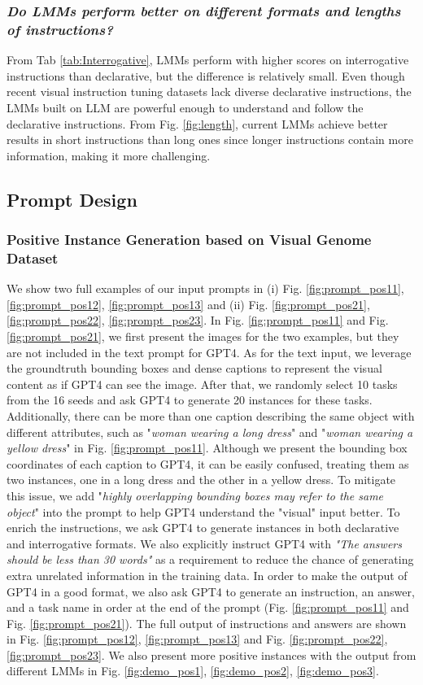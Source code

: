 \subsubsection{\textit{Do LMMs perform better on different formats and lengths of instructions? }}

From Tab \ref{tab:Interrogative}, LMMs perform with higher scores on interrogative instructions than declarative, but the difference is relatively small. Even though recent visual instruction tuning datasets lack diverse declarative instructions, the LMMs built on LLM are powerful enough to understand and follow the declarative instructions. From Fig. \ref{fig:length}, current LMMs achieve better results in short instructions than long ones since longer instructions contain more information, making it more challenging. 

\subsection{Prompt Design}
\subsubsection{Positive Instance Generation based on Visual Genome Dataset}
We show two full examples of our input prompts in (i) Fig. \ref{fig:prompt_pos11}, \ref{fig:prompt_pos12}, \ref{fig:prompt_pos13} and (ii) Fig. \ref{fig:prompt_pos21}, \ref{fig:prompt_pos22}, \ref{fig:prompt_pos23}. In Fig. \ref{fig:prompt_pos11} and Fig. \ref{fig:prompt_pos21}, we first present the images for the two examples, but they are not included in the text prompt for GPT4. As for the text input, we leverage the groundtruth bounding boxes and dense captions to represent the visual content as if GPT4 can see the image. After that, we randomly select 10 tasks from the 16 seeds and ask GPT4 to generate 20 instances for these tasks. Additionally, there can be more than one caption describing the same object with different attributes, such as "\textit{woman wearing a long dress}" and "\textit{woman wearing a yellow dress}" in Fig. \ref{fig:prompt_pos11}. Although we present the bounding box coordinates of each caption to GPT4, it can be easily confused, treating them as two instances, one in a long dress and the other in a yellow dress. To mitigate this issue, we add "\textit{highly overlapping bounding boxes may refer to the same object}" into the prompt to help GPT4 understand the "visual" input better. To enrich the instructions, we ask GPT4 to generate instances in both declarative and interrogative formats. We also explicitly instruct GPT4 with \textit{"The answers should be less than 30 words"} as a requirement to reduce the chance of generating extra unrelated information in the training data. In order to make the output of GPT4 in a good format, we also ask GPT4 to generate an instruction, an answer, and a task name in order at the end of the prompt (Fig. \ref{fig:prompt_pos11} and Fig. \ref{fig:prompt_pos21}). The full output of instructions and answers are shown in Fig. \ref{fig:prompt_pos12}, \ref{fig:prompt_pos13} and Fig. \ref{fig:prompt_pos22}, \ref{fig:prompt_pos23}. We also present more positive instances with the output from different LMMs in Fig. \ref{fig:demo_pos1}, \ref{fig:demo_pos2}, \ref{fig:demo_pos3}.

